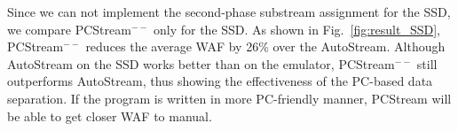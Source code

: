 Since we can not implement the second-phase substream assignment
for the SSD, we compare {\sf PCStream}$^{--}$ only for the SSD.
As shown in Fig.~\ref{fig:result_SSD}, 
{\sf PCStream}$^{--}$ reduces the average WAF by 26\% over the AutoStream. 
Although AutoStream on the SSD works better than on the emulator,
{\sf PCStream}$^{--}$ still outperforms AutoStream,
thus showing the effectiveness of the PC-based 
data separation.
If the program is written in more PC-friendly manner, 
{\sf PCStream} will be able to get closer WAF to manual.
